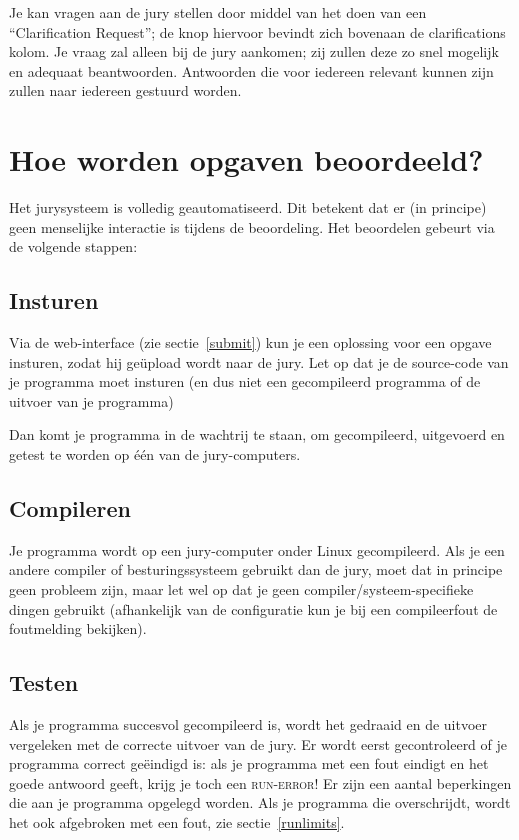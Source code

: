 Je kan vragen aan de jury stellen door middel van het doen van een
``Clarification Request''; de knop hiervoor bevindt zich bovenaan de
clarifications kolom.  Je vraag zal alleen bij de jury aankomen; zij
zullen deze zo snel mogelijk en adequaat beantwoorden. Antwoorden die
voor iedereen relevant kunnen zijn zullen naar iedereen gestuurd worden.

\section{Hoe worden opgaven beoordeeld?}

Het \DOMjudge jurysysteem is volledig geautomatiseerd. Dit betekent
dat er (in principe) geen menselijke interactie is tijdens de
beoordeling. Het beoordelen gebeurt via de volgende stappen:

\subsection{Insturen}

Via%
de web-interface (zie sectie~\ref{submit}) kun je een oplossing voor
een opgave insturen, zodat hij ge\"upload wordt naar de jury. Let op
dat je de source-code van je programma moet insturen (en dus niet een
gecompileerd programma of de uitvoer van je programma)

Dan komt je programma in de wachtrij te staan, om gecompileerd,
uitgevoerd en getest te worden op \'e\'en van de jury-computers.

\subsection{Compileren}

Je programma wordt op een jury-computer onder Linux gecompileerd.
Als je een andere compiler of besturingssysteem gebruikt dan de jury,
moet dat in principe geen probleem zijn, maar let wel op dat
je geen compiler/systeem-specifieke dingen gebruikt (afhankelijk van
de configuratie kun je bij een compileerfout de foutmelding bekijken).

\subsection{Testen}

Als je programma succesvol gecompileerd is, wordt het gedraaid en de
uitvoer vergeleken met de correcte uitvoer van de jury. Er wordt eerst
gecontroleerd of je programma correct ge\"eindigd is: als je programma
met een fout eindigt en het goede antwoord geeft, krijg je toch een
\textsc{run-error}! Er zijn een aantal beperkingen die aan je programma
opgelegd worden. Als je programma die overschrijdt, wordt het ook
afgebroken met een fout, zie sectie~\ref{runlimits}.

